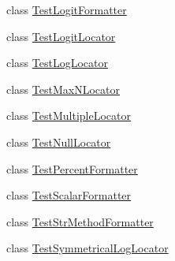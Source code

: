 \begin{DoxyCompactItemize}
\item 
class \hyperlink{classmatplotlib_1_1tests_1_1test__ticker_1_1TestLogitFormatter}{Test\+Logit\+Formatter}
\item 
class \hyperlink{classmatplotlib_1_1tests_1_1test__ticker_1_1TestLogitLocator}{Test\+Logit\+Locator}
\item 
class \hyperlink{classmatplotlib_1_1tests_1_1test__ticker_1_1TestLogLocator}{Test\+Log\+Locator}
\item 
class \hyperlink{classmatplotlib_1_1tests_1_1test__ticker_1_1TestMaxNLocator}{Test\+Max\+N\+Locator}
\item 
class \hyperlink{classmatplotlib_1_1tests_1_1test__ticker_1_1TestMultipleLocator}{Test\+Multiple\+Locator}
\item 
class \hyperlink{classmatplotlib_1_1tests_1_1test__ticker_1_1TestNullLocator}{Test\+Null\+Locator}
\item 
class \hyperlink{classmatplotlib_1_1tests_1_1test__ticker_1_1TestPercentFormatter}{Test\+Percent\+Formatter}
\item 
class \hyperlink{classmatplotlib_1_1tests_1_1test__ticker_1_1TestScalarFormatter}{Test\+Scalar\+Formatter}
\item 
class \hyperlink{classmatplotlib_1_1tests_1_1test__ticker_1_1TestStrMethodFormatter}{Test\+Str\+Method\+Formatter}
\item 
class \hyperlink{classmatplotlib_1_1tests_1_1test__ticker_1_1TestSymmetricalLogLocator}{Test\+Symmetrical\+Log\+Locator}
\end{DoxyCompactItemize}
